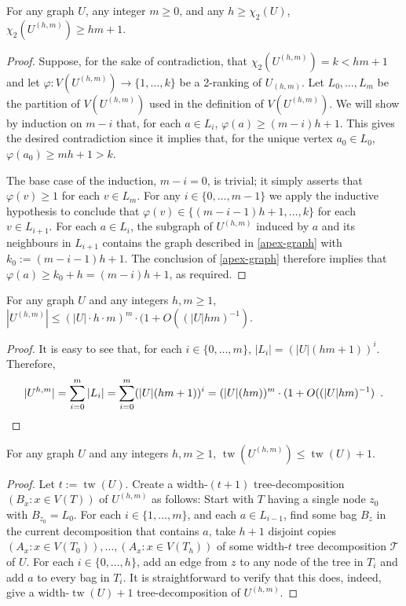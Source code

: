 \documentclass[kpfonts]{patmorin}
\DeclareMathOperator{\tw}{tw}
\newcommand{\trn}{\chi_2}
\theoremstyle{named}
\begin{document}
\begin{lem}\label{boost}
    For any graph $U$, any integer $m\ge 0$, and any $h\ge\trn(U)$, $\trn(U^{(h,m)})\ge hm +1$.
\end{lem}

\begin{proof}
    Suppose, for the sake of contradiction, that $\trn(U^{(h,m)})=k<hm+1$ and let $\varphi:V(U^{(h,m)})\to\{1,\ldots,k\}$ be a 2-ranking of $U_{(h,m)}$.  Let $L_0,\ldots,L_{m}$ be the partition of $V(U^{(h,m)})$ used in the definition of $V(U^{(h,m)})$.
    We will show by induction on $m-i$ that, for each $a\in L_{i}$, $\varphi(a)\ge(m-i)h+1$. This gives the desired contradiction since it implies that, for the unique vertex $a_0\in L_0$, $\varphi(a_0)\ge m h+1 > k$.

    The base case of the induction, $m-i=0$, is trivial; it simply asserts that $\varphi(v)\ge 1$ for each $v\in L_m$.  For any $i\in\{0,\ldots,m-1\}$ we apply the inductive hypothesis to conclude that $\varphi(v)\in\{(m-i-1)h+1,\ldots,k\}$ for each $v\in L_{i+1}$.  For each $a\in L_i$, the subgraph of $U^{(h,m)}$ induced by $a$ and its neighbours in $L_{i+1}$ contains the graph described in \cref{apex-graph} with $k_0:=(m-i-1)h+1$.  The conclusion of \cref{apex-graph} therefore implies that $\varphi(a)\ge k_0+h=(m-i)h+1$, as required.
\end{proof}

\begin{lem}\label{boost-size}
    For any graph $U$ and any integers $h,m \ge 1$, $|U^{(h,m)}| \le (|U|\cdot h\cdot m)^{m}\cdot (1+O((|U|hm)^{-1})$.
\end{lem}

\begin{proof}
    It is easy to see that, for each $i\in \{0,\ldots,m\}$, $|L_i|=(|U|(hm+1))^i$.  Therefore,
    \[ |U^{h,m}| = \sum_{i=0}^m |L_i| = \sum_{i=0}^m (|U|(hm+1))^i = (|U|(hm))^{m}\cdot (1+O((|U|hm)^{-1}) \enspace . \qedhere
    \]
\end{proof}


\begin{lem}\label{boost-treewidth}
    For any graph $U$ and any integers $h,m\ge 1$, $\tw(U^{(h,m)})\le \tw(U)+1$.
\end{lem}

\begin{proof}
  Let $t:=\tw(U)$.
  Create a width-$(t+1)$ tree-decomposition $(B_x:x\in V(T))$ of $U^{(h,m)}$ as follows: Start with $T$ having a single node $z_0$ with $B_{z_0}=L_0$.  For each $i\in\{1,\ldots,m\}$, and each $a\in L_{i-1}$, find some bag $B_z$ in the current decomposition that contains $a$, take $h+1$ disjoint copies $(A_x:x\in V(T_0)),\ldots,(A_x:x\in V(T_h))$ of some width-$t$ tree decomposition $\mathcal{T}$ of $U$.  For each $i\in\{0,\ldots,h\}$, add an edge from $z$ to any node of the tree in $T_i$ and add $a$ to every bag in $T_i$.  It is straightforward to verify that this does, indeed, give a width-$\tw(U)+1$ tree-decomposition of $U^{(h,m)}$.
\end{proof}
\end{document}
